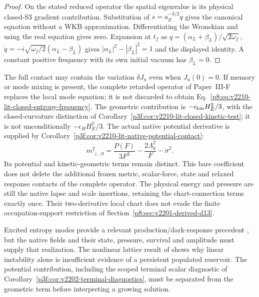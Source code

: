 \documentclass[12pt,a4paper]{article}
\begin{document}
\begin{proof}
On the stated reduced operator the spatial eigenvalue is its physical
closed-S3 gradient contribution. Substitution of $s=a_E^{-3/2}q$ gives
the canonical equation without a WKB approximation. Differentiating the
Wronskian and using the real equation gives zero. Expansion at $t_f$ as
$q=(\alpha_L+\beta_L)/\sqrt{2\omega_f}$,
$\dot q=-i\sqrt{\omega_f/2}(\alpha_L-\beta_L)$ gives
$|\alpha_L|^2-|\beta_L|^2=1$ and the displayed identity. A constant
positive frequency with its own initial vacuum has $\beta_L=0$.
\end{proof}
The full contact may contain the variation $\delta J_u$ even when
$J_u(0)=0$. If memory or mode mixing is present, the complete retarded
operator of Paper~III-F replaces the local mode equation; it is not
discarded to obtain Eq.~\eqref{p8:eq:v2210-lit-closed-entropy-frequency}.
The geometric contribution is
$-\epsilon_{\rm kin}H_E^2/3$, with the closed-curvature distinction of
Corollary~\ref{p3f:cor:v2210-lit-closed-kinetic-test}; it is not
unconditionally $-\epsilon_HH_E^2/3$.
The actual native potential derivative is supplied by
Corollary~\ref{p3f:cor:v2210-lit-native-potential-contact}:
\[
 m_{\perp,0}^2=\frac{P(F)}{3F^2}
                  -\frac{2\Lambda_g^2}{F}-\dot\sigma^2.
\]
Its potential and kinetic-geometric terms remain distinct. This bare
coefficient does not delete the additional frozen metric, scalar-force,
state and relaxed response contacts of the complete operator.
The physical energy and pressure are still the native lapse and scale
insertions, retaining the chart-connection terms exactly once. Their
two-derivative local chart does not evade the finite occupation-support
restriction of Section~\ref{p8:sec:v2201-derived-d13}.

Excited entropy modes provide a relevant production/dark-response precedent
\cite{LitCOSFirouzjahi2022}, but the native fields and their state, pressure,
survival and amplitude must supply that realization. The nonlinear lattice
result of \cite{LitCOSKrajewskiTurzynski2022} shows why linear instability
alone is insufficient evidence of a persistent populated reservoir.
The potential contribution, including the scoped terminal scalar diagnostic
of Corollary~\ref{p3f:cor:v2202-terminal-diagnostics}, must be separated
from the geometric term before interpreting a growing solution.

\end{document}
